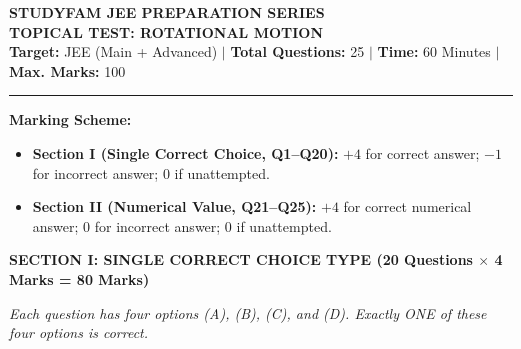 \documentclass[11pt,a4paper]{article}
\begin{document}
\begin{tcolorbox}[testheader]
\begin{center}
  {\LARGE \textbf{\textsf{\textcolor{deepblue}{STUDYFAM JEE PREPARATION SERIES}}}}\\[3pt]
  {\large \textbf{\textsf{TOPICAL TEST: ROTATIONAL MOTION}}}\\[6pt]
  {\small \textbf{Target:} JEE (Main + Advanced) \quad $\vert$ \quad \textbf{Total Questions:} 25 \quad $\vert$ \quad \textbf{Time:} 60 Minutes \quad $\vert$ \quad \textbf{Max. Marks:} 100}
\end{center}
\vspace{-4pt}
\hrule
\vspace{6pt}
\footnotesize
\textbf{Marking Scheme:}
\begin{itemize}[leftmargin=15pt,itemsep=1pt,topsep=1pt]
  \item \textbf{Section I (Single Correct Choice, Q1--Q20):} $+4$ for correct answer; $-1$ for incorrect answer; $0$ if unattempted.
  \item \textbf{Section II (Numerical Value, Q21--Q25):} $+4$ for correct numerical answer; $0$ for incorrect answer; $0$ if unattempted.
\end{itemize}
\end{tcolorbox}

\vspace{10pt}

\begin{tcolorbox}[sectionheader]
  \textbf{\textsf{SECTION I: SINGLE CORRECT CHOICE TYPE (20 Questions $\times$ 4 Marks = 80 Marks)}}
\end{tcolorbox}
\vspace{4pt}
\textit{Each question has four options (A), (B), (C), and (D). Exactly ONE of these four options is correct.}
\vspace{6pt}
\end{document}
